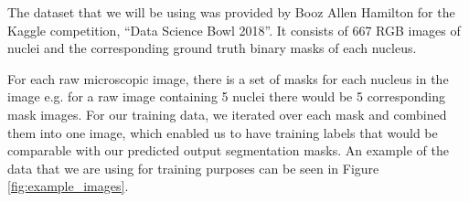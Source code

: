 \documentclass{article}
\begin{document}
The dataset that we will be using was provided by Booz Allen Hamilton for the Kaggle competition, ``Data Science Bowl 2018''. It consists of 667 RGB images of nuclei and the corresponding ground truth binary masks of each nucleus.

For each raw microscopic image, there is a set of masks for each nucleus in the image e.g. for a raw image containing 5 nuclei there would be 5 corresponding mask images. For our training data, we iterated over each mask and combined them into one image, which enabled us to have training labels that would be comparable with our predicted output segmentation masks. An example of the data that we are using for training purposes can be seen in Figure \ref{fig:example_images}.

\end{document}
